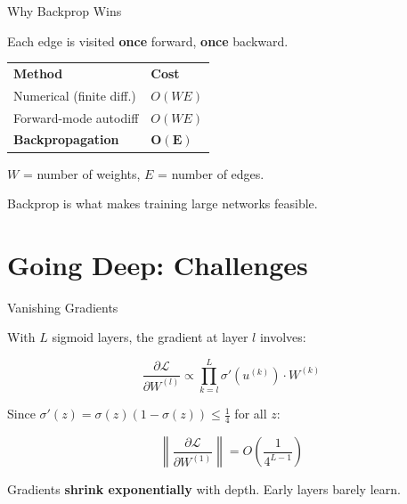 \documentclass[aspectratio=169, professionalfonts]{beamer}
\begin{document}
\begin{frame}{Why Backprop Wins}

Each edge is visited \textbf{once} forward, \textbf{once} backward.

\bigskip

\begin{center}
\begin{tabular}{ll}
\textbf{Method} & \textbf{Cost} \\[2pt]
Numerical (finite diff.) & $O(WE)$ \\
Forward-mode autodiff & $O(WE)$ \\
\textbf{Backpropagation} & $\bm{O(E)}$
\end{tabular}
\end{center}

\bigskip

$W$ = number of weights, $E$ = number of edges.

Backprop is what makes training large networks feasible.

\end{frame}

\section{Going Deep: Challenges}

\begin{frame}{Vanishing Gradients}

With $L$ sigmoid layers, the gradient at layer $l$ involves:

$$\frac{\partial\mathcal{L}}{\partial W^{(l)}}
  \propto \prod_{k=l}^{L}\sigma'(u^{(k)})\cdot W^{(k)}$$

\bigskip

Since $\sigma'(z) = \sigma(z)(1-\sigma(z)) \le \frac{1}{4}$
for all $z$:

$$\left\|\frac{\partial\mathcal{L}}{\partial W^{(1)}}\right\|
  = O\!\left(\frac{1}{4^{L-1}}\right)$$

\bigskip

Gradients \textbf{shrink exponentially} with depth.
Early layers barely learn.

\end{frame}
\end{document}
